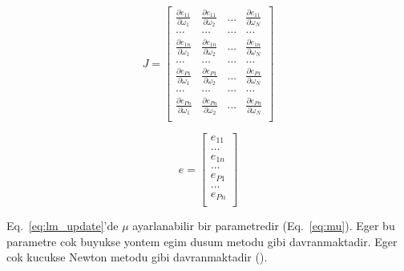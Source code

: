 \documentclass[]{interact}
\theoremstyle{plain}%
\theoremstyle{definition}
\theoremstyle{remark}
\begin{document}
\begin{equation}
\label{eq:jacobian}
 J = \begin{bmatrix}
       \frac{\partial e_{11}}{\partial\omega_1} & 
       \frac{\partial e_{11}}{\partial\omega_2} &
       \dots &
       \frac{\partial e_{11}}{\partial\omega_N} \\[0.3em]
       \dots & \dots & \dots & \dots \\[0.3em] 
         
       \frac{\partial e_{1n}}{\partial\omega_1} & 
       \frac{\partial e_{1n}}{\partial\omega_2} &
       \dots &
	   \frac{\partial e_{1n}}{\partial\omega_N} \\[0.3em]
	   \dots & \dots & \dots & \dots \\[0.3em]
	   
	   \frac{\partial e_{P1}}{\partial\omega_1} & 
       \frac{\partial e_{P1}}{\partial\omega_2} &
       \dots &
       \frac{\partial e_{P1}}{\partial\omega_N} \\[0.3em]
       \dots & \dots & \dots & \dots \\[0.3em] 
       
       \frac{\partial e_{Pn}}{\partial\omega_1} & 
       \frac{\partial e_{Pn}}{\partial\omega_2} &
       \dots &
	   \frac{\partial e_{Pn}}{\partial\omega_N} \\[0.3em]       
                  
     \end{bmatrix}
\end{equation}

\begin{equation}
\label{eq:error}
 e = \begin{bmatrix}
       e_{11} \\[0.3em]
       \dots \\[0.3em] 
       
       e_{1n} \\[0.3em]
       \dots \\[0.3em]          

       e_{P1} \\[0.3em]
       \dots \\[0.3em] 
       
       e_{Pn} \\[0.3em]             
                  
     \end{bmatrix}
\end{equation}

Eq.~\ref{eq:lm_update}'de $\mu$ ayarlanabilir bir parametredir (Eq.~\ref{eq:mu}). Eger bu parametre cok buyukse yontem egim dusum metodu gibi davranmaktadir. Eger cok kucukse Newton metodu gibi davranmaktadir (\citep{Has10}).
\end{document}
